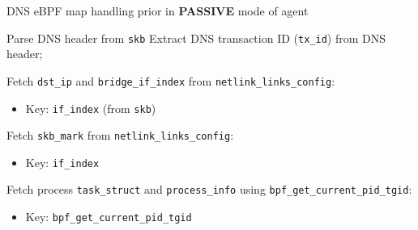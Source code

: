 \documentclass [11pt, proquest] {uwthesis}[2020/02/24]
\begin{document}
\begin{algorithm}[H]
\caption{DNS eBPF map handling prior  in \textbf{PASSIVE} mode of agent}
\label{sec:alg5}

\small %





Parse DNS header from \texttt{skb}\;
Extract DNS transaction ID (\texttt{tx\_id}) from DNS header;

Fetch \texttt{dst\_ip} and \texttt{bridge\_if\_index} from \texttt{netlink\_links\_config}:
\begin{itemize}[nosep]
    \item Key: \texttt{if\_index} (from \texttt{skb})
\end{itemize}
Fetch \texttt{skb\_mark} from \texttt{netlink\_links\_config}:
\begin{itemize}[nosep]
    \item Key: \texttt{if\_index}
\end{itemize}

Fetch process \texttt{task\_struct} and \texttt{process\_info} using \texttt{bpf\_get\_current\_pid\_tgid}:
\begin{itemize}[nosep]
    \item Key: \texttt{bpf\_get\_current\_pid\_tgid}
\end{itemize}


\end{algorithm}
\end{document}
